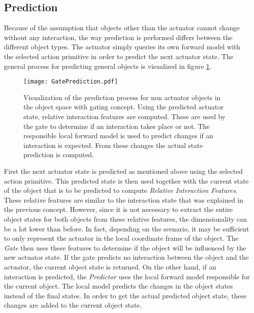 \subsection{Prediction \label{sec:gatePrediction}}

Because of the assumption that objects other than the actuator cannot change without any interaction, the way prediction is performed differs between the different object types. The actuator simply queries its own forward model with the selected action primitive in order to predict the next actuator state. 
The general process for predicting general objects is visualized in figure \ref{fig:GatePrediction}.

\begin{figure}
	\centering
	\texttt{[image: GatePrediction.pdf]}
	\caption{Visualization of the prediction process for non actuator objects in the object space with gating concept. Using the predicted actuator state, relative interaction features are computed. These are used by the gate to determine if an interaction takes place or not. The responsible local forward model is used to predict %
	changes if an interaction is expected. From these changes the actual state prediction is computed.} %
	\label{fig:GatePrediction}
\end{figure}

First the next actuator state is predicted as mentioned above using the selected action primitive.
This predicted state is then used together with the current state of the object that is to be predicted to compute \textit{Relative Interaction Features}. These relative features are similar to the interaction state that was explained in the previous concept. However, since it is not necessary to extract the entire object states for both objects from these relative features, the dimensionality can be a lot lower than before. In fact, depending on the scenario, it may be sufficient to only represent the actuator in the local coordinate frame of the object. 
The \textit{Gate} then uses these features to determine if the object will be influenced by the new actuator state. If the gate predicts no interaction between the object and the actuator, the current object state is returned. 
On the other hand, if an interaction is predicted, the \textit{Predictor} uses the local forward model responsible for the current object. 
The local model predicts the changes in the object states instead of the final states. In order to get the actual predicted object state, these changes are added to the current object state.

